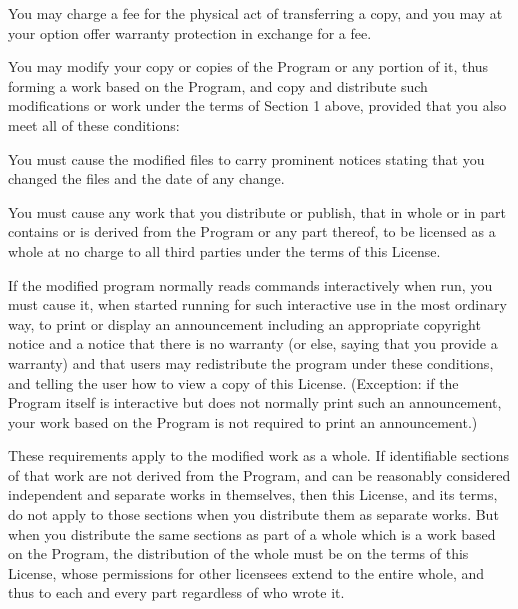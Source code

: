 \begin{lrbox}{\gpl}
\begin{minipage}{3\textwidth}
      You may charge a fee for the physical act of transferring a copy,
      and you may at your option offer warranty protection in exchange
      for a fee.

\item You may modify your copy or copies of the Program or any portion
      of it, thus forming a work based on the Program, and copy and
      distribute such modifications or work under the terms of Section
      1 above, provided that you also meet all of these conditions:

      \beginenumeration

      \item You must cause the modified files to carry prominent notices
            stating that you changed the files and the date of any change.

      \item You must cause any work that you distribute or publish, that in
            whole or in part contains or is derived from the Program or any
            part thereof, to be licensed as a whole at no charge to all third
            parties under the terms of this License.

      \item If the modified program normally reads commands interactively
            when run, you must cause it, when started running for such
            interactive use in the most ordinary way, to print or display an
            announcement including an appropriate copyright notice and a
            notice that there is no warranty (or else, saying that you
            provide a warranty) and that users may redistribute the program
            under these conditions, and telling the user how to view a copy
            of this License.  (Exception: if the Program itself is
            interactive but does not normally print such an announcement,
            your work based on the Program is not required to print an
            announcement.)

      \endenumeration


      These requirements apply to the modified work as a whole.  If
      identifiable sections of that work are not derived from the
      Program, and can be reasonably considered independent and
      separate works in themselves, then this License, and its terms,
      do not apply to those sections when you distribute them as
      separate works.  But when you distribute the same sections as
      part of a whole which is a work based on the Program, the
      distribution of the whole must be on the terms of this License,
      whose permissions for other licensees extend to the entire whole,
      and thus to each and every part regardless of who wrote it.


\end{minipage}
\end{lrbox}
